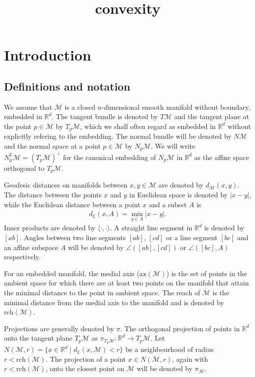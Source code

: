 \documentclass{article}
\newcommand{\M}{\mathcal{M}}
\newcommand{\rch}{\mathrm{rch}}
\begin{document}
\title{convexity}
\author{}
\maketitle

\section{Introduction}





\subsection{Definitions and notation} 

We assume that $\M$ is a closed $n$-dimensional smooth manifold without boundary, embedded in $\mathbb{R}^d$. The tangent bundle is denoted by $T\M$ and the tangent plane at the point $p \in \M$ by $T_p \M$, which we shall often regard as embedded in $\mathbb{R}^d$ without explicitly refering to the embedding. The normal bundle will be denoted by $N\M$ and the normal space at a point $p\in \M$ by $N_p\M$. We will write $N_p^{\mathbb{E}}\M=( T_p \M )^{\perp} $ for the canonical embedding of $N_p\M$ in $\mathbb{R}^d$ as the affine space orthogonal to $T_p\M$.


Geodesic distances on manifolds between $x,y \in \M$ are denoted by $d_\M(x,y)$. The distance between the points $x$ and $y$ in Euclidean space is denoted by $|x-y|$, while the Euclidean distance between a point $x$ and a subset $A$ is 
\begin{align} 
d_{\mathbb{E}} (x,A) = \min_{y \in A}  |x-y| .  
\nonumber 
\end{align}
Inner products are denoted by $\langle \cdot , \cdot \rangle$. 
A straight line segment in $\mathbb{R}^d$ is denoted by $[ab]$. Angles between two line segments $[ab]$, $[cd]$ or a line segment $[bc]$ and an affine subspace $A$ will be denoted by $\angle ([ab], [cd] )$ or $\angle ([bc], A)  $ respectively.

For an embedded manifold, the medial axis ($\textrm{ax}(\M)$) is the set of points in the ambient space for which there are at least two points on the manifold that attain the minimal distance to the point in ambient space. The reach of $\M$ is the minimal distance from the medial axis to the manifold and is denoted by $\rch(\M)$.

Projections are generally denoted by $\pi$. The orthogonal projection of points in $\mathbb{R}^d$ onto the tangent plane $T_p \M$ as $\pi_{T_p \M}: \mathbb{R}^d \to  T_p \M$.  Let $N(\M, r)= \{x \in \mathbb{R}^d \mid d_{\mathbb{E}} (x, \M) <r\} $ be a neighbourhood of radius $r < \rch (\M)$. The projection of a point $x \in N(\M, r)$, again with $r< \rch (\M)$, onto the closest point on $\M$ will be denoted by $\pi_\M$.
\end{document}
